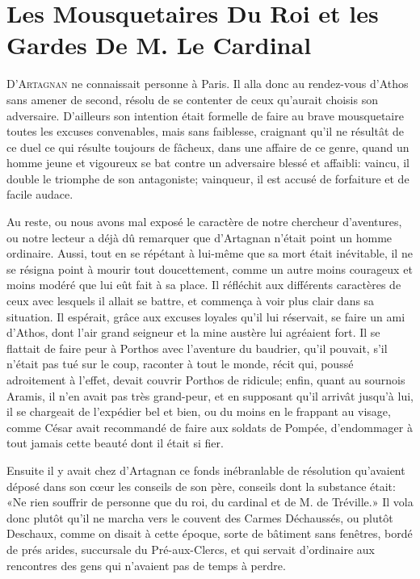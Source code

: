 

\chapter[Les Mousquetaires et les Gardes]{Les Mousquetaires Du Roi et les Gardes De M. Le Cardinal} 
	
\lettrine{D}{'Artagnan} ne connaissait personne à Paris. Il alla donc au rendez-vous d'Athos sans amener de second, résolu de se contenter de ceux qu'aurait choisis son adversaire. D'ailleurs son intention était formelle de faire au brave mousquetaire toutes les excuses convenables, mais sans faiblesse, craignant qu'il ne résultât de ce duel ce qui résulte toujours de fâcheux, dans une affaire de ce genre, quand un homme jeune et vigoureux se bat contre un adversaire blessé et affaibli: vaincu, il double le triomphe de son antagoniste; vainqueur, il est accusé de forfaiture et de facile audace. 

Au reste, ou nous avons mal exposé le caractère de notre chercheur d'aventures, ou notre lecteur a déjà dû remarquer que d'Artagnan n'était point un homme ordinaire. Aussi, tout en se répétant à lui-même que sa mort était inévitable, il ne se résigna point à mourir tout doucettement, comme un autre moins courageux et moins modéré que lui eût fait à sa place. Il réfléchit aux différents caractères de ceux avec lesquels il allait se battre, et commença à voir plus clair dans sa situation. Il espérait, grâce aux excuses loyales qu'il lui réservait, se faire un ami d'Athos, dont l'air grand seigneur et la mine austère lui agréaient fort. Il se flattait de faire peur à Porthos avec l'aventure du baudrier, qu'il pouvait, s'il n'était pas tué sur le coup, raconter à tout le monde, récit qui, poussé adroitement à l'effet, devait couvrir Porthos de ridicule; enfin, quant au sournois Aramis, il n'en avait pas très grand-peur, et en supposant qu'il arrivât jusqu'à lui, il se chargeait de l'expédier bel et bien, ou du moins en le frappant au visage, comme César avait recommandé de faire aux soldats de Pompée, d'endommager à tout jamais cette beauté dont il était si fier. 

Ensuite il y avait chez d'Artagnan ce fonds inébranlable de résolution qu'avaient déposé dans son cœur les conseils de son père, conseils dont la substance était: «Ne rien souffrir de personne que du roi, du cardinal et de M. de Tréville.» Il vola donc plutôt qu'il ne marcha vers le couvent des Carmes Déchaussés, ou plutôt Deschaux, comme on disait à cette époque, sorte de bâtiment sans fenêtres, bordé de prés arides, succursale du Pré-aux-Clercs, et qui servait d'ordinaire aux rencontres des gens qui n'avaient pas de temps à perdre. 

